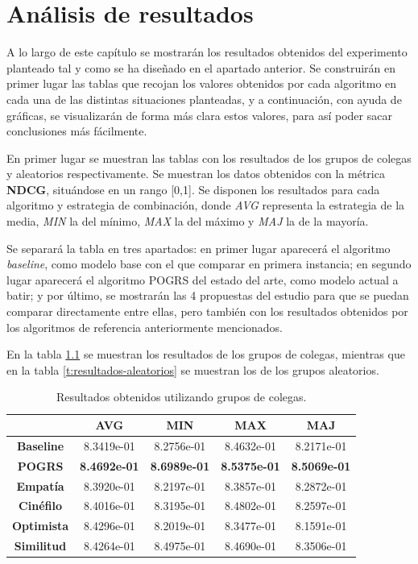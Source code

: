 \chapter{Análisis de resultados}

A lo largo de este capítulo se mostrarán los resultados obtenidos del experimento planteado tal y como se ha diseñado en el apartado anterior. Se construirán en primer lugar las tablas que recojan los valores obtenidos por cada algoritmo en cada una de las distintas situaciones planteadas, y a continuación, con ayuda de gráficas, se visualizarán de forma más clara estos valores, para así poder sacar conclusiones más fácilmente.

En primer lugar se muestran las tablas con los resultados de los grupos de colegas y aleatorios respectivamente. Se muestran los datos obtenidos con la métrica \textbf{NDCG}, situándose en un rango [0,1]. Se disponen los resultados para cada algoritmo y estrategia de combinación, donde \textit{AVG} representa la estrategia de la media, \textit{MIN} la del mínimo, \textit{MAX} la del máximo y \textit{MAJ} la de la mayoría.

Se separará la tabla en tres apartados: en primer lugar aparecerá el algoritmo \textit{baseline}, como modelo base con el que comparar en primera instancia; en segundo lugar aparecerá el algoritmo POGRS del estado del arte, como modelo actual a batir; y por último, se mostrarán las 4 propuestas del estudio para que se puedan comparar directamente entre ellas, pero también con los resultados obtenidos por los algoritmos de referencia anteriormente mencionados.

En la tabla \ref{t:resultados-colegas} se muestran los resultados de los grupos de colegas, mientras que en la tabla \ref{t:resultados-aleatorios} se muestran los de los grupos aleatorios.

\begin{table}[H]
	\centering
	\begin{tabular}{ccccc}
		\toprule
		{} & \textbf{AVG} & \textbf{MIN} & \textbf{MAX} & \textbf{MAJ} \\
		\midrule
		\textbf{Baseline} & 8.3419e-01 & 8.2756e-01 & 8.4632e-01 & 8.2171e-01 \\
		\midrule
		\textbf{POGRS} & \textbf{8.4692e-01} & \textbf{8.6989e-01} & \textbf{8.5375e-01} & \textbf{8.5069e-01} \\
		\midrule
		\textbf{Empatía} & 8.3920e-01 & 8.2197e-01 & 8.3857e-01 & 8.2872e-01 \\
		\textbf{Cinéfilo} & 8.4016e-01 & 8.3195e-01 & 8.4802e-01 & 8.2597e-01 \\
		\textbf{Optimista} & 8.4296e-01 & 8.2019e-01 & 8.3477e-01 & 8.1591e-01 \\
		\textbf{Similitud} & 8.4264e-01 & 8.4975e-01 & 8.4690e-01 & 8.3506e-01 \\
		\bottomrule
	\end{tabular}
	\caption{Resultados obtenidos utilizando grupos de colegas.}
	\label{t:resultados-colegas}
\end{table}

